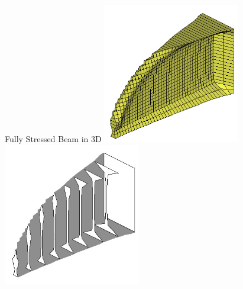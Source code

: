 \documentclass[10pt, svgnames]{beamer}
\begin{document}
\begin{frame}[label={sec:org93140df}]{Fully Stressed Beam in 3D}
\centering
\includegraphics[width=0.45\textwidth]{pictures/fea-fully-stressed-beam-3d}
\includegraphics[width=0.45\textwidth]{pictures/fea-fully-stressed-beam-3d-section}
\end{frame}
\end{document}
